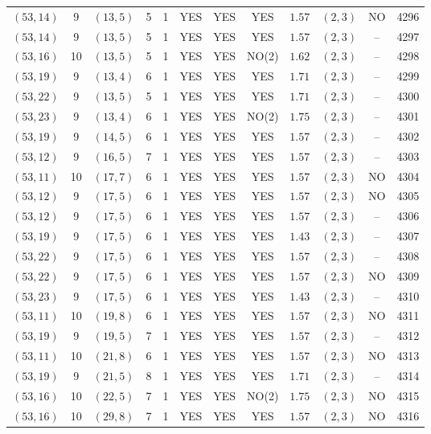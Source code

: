 \begin{longtable}{|c|c|c|c|c|c|c|c|c|c|c|c|}
$(53,14)$ & 9 & $(13,5)$ & 5 & 1 & YES & YES & YES & $1.57$ & $(2,3)$ & NO & 4296\\
$(53,14)$ & 9 & $(13,5)$ & 5 & 1 & YES & YES & YES & $1.57$ & $(2,3)$ & -- & 4297\\
$(53,16)$ & 10 & $(13,5)$ & 5 & 1 & YES & YES & NO(2) & $1.62$ & $(2,3)$ & -- & 4298\\
$(53,19)$ & 9 & $(13,4)$ & 6 & 1 & YES & YES & YES & $1.71$ & $(2,3)$ & -- & 4299\\
$(53,22)$ & 9 & $(13,5)$ & 5 & 1 & YES & YES & YES & $1.71$ & $(2,3)$ & -- & 4300\\
$(53,23)$ & 9 & $(13,4)$ & 6 & 1 & YES & YES & NO(2) & $1.75$ & $(2,3)$ & -- & 4301\\
$(53,19)$ & 9 & $(14,5)$ & 6 & 1 & YES & YES & YES & $1.57$ & $(2,3)$ & -- & 4302\\
$(53,12)$ & 9 & $(16,5)$ & 7 & 1 & YES & YES & YES & $1.57$ & $(2,3)$ & -- & 4303\\
$(53,11)$ & 10 & $(17,7)$ & 6 & 1 & YES & YES & YES & $1.57$ & $(2,3)$ & NO & 4304\\
$(53,12)$ & 9 & $(17,5)$ & 6 & 1 & YES & YES & YES & $1.57$ & $(2,3)$ & NO & 4305\\
$(53,12)$ & 9 & $(17,5)$ & 6 & 1 & YES & YES & YES & $1.57$ & $(2,3)$ & -- & 4306\\
$(53,19)$ & 9 & $(17,5)$ & 6 & 1 & YES & YES & YES & $1.43$ & $(2,3)$ & -- & 4307\\
$(53,22)$ & 9 & $(17,5)$ & 6 & 1 & YES & YES & YES & $1.57$ & $(2,3)$ & -- & 4308\\
$(53,22)$ & 9 & $(17,5)$ & 6 & 1 & YES & YES & YES & $1.57$ & $(2,3)$ & NO & 4309\\
$(53,23)$ & 9 & $(17,5)$ & 6 & 1 & YES & YES & YES & $1.43$ & $(2,3)$ & -- & 4310\\
$(53,11)$ & 10 & $(19,8)$ & 6 & 1 & YES & YES & YES & $1.57$ & $(2,3)$ & NO & 4311\\
$(53,19)$ & 9 & $(19,5)$ & 7 & 1 & YES & YES & YES & $1.57$ & $(2,3)$ & -- & 4312\\
$(53,11)$ & 10 & $(21,8)$ & 6 & 1 & YES & YES & YES & $1.57$ & $(2,3)$ & NO & 4313\\
$(53,19)$ & 9 & $(21,5)$ & 8 & 1 & YES & YES & YES & $1.71$ & $(2,3)$ & -- & 4314\\
$(53,16)$ & 10 & $(22,5)$ & 7 & 1 & YES & YES & NO(2) & $1.75$ & $(2,3)$ & NO & 4315\\
$(53,16)$ & 10 & $(29,8)$ & 7 & 1 & YES & YES & YES & $1.57$ & $(2,3)$ & NO & 4316\\

\end{longtable}
